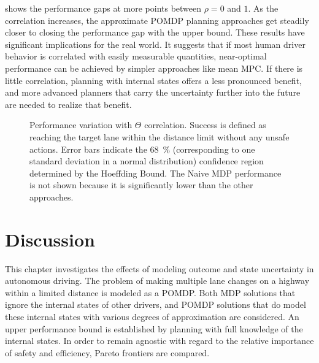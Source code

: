  shows the performance gaps at more points between $\rho=0$ and $1$.
As the correlation increases, the approximate POMDP planning approaches get steadily closer to closing the performance gap with the upper bound.
These results have significant implications for the real world.
It suggests that if most human driver behavior is correlated with easily measurable quantities, near-optimal performance can be achieved by simpler approaches like mean MPC.
If there is little correlation, planning with internal states offers a less pronounced benefit, and more advanced planners that carry the uncertainty further into the future are needed to realize that benefit.

\begin{figure}[htbp]
    \centering
    
    \caption[Performance variation with $\Theta$ correlation]{Performance variation with $\Theta$ correlation. Success is defined as reaching the target lane within the distance limit without any unsafe actions. Error bars indicate the \SI{68}{\percent} (corresponding to one standard deviation in a normal distribution) confidence region determined by the Hoeffding Bound. The Naive MDP performance is not shown because it is significantly lower than the other approaches.}
    \label{fig:corplot}
\end{figure}


\section{Discussion}

This chapter investigates the effects of modeling outcome and state uncertainty in autonomous driving.
The problem of making multiple lane changes on a highway within a limited distance is modeled as a POMDP.
Both MDP solutions that ignore the internal states of other drivers, and POMDP solutions that do model these internal states with various degrees of approximation are considered.
An upper performance bound is established by planning with full knowledge of the internal states.
In order to remain agnostic with regard to the relative importance of safety and efficiency, Pareto frontiers are compared.

